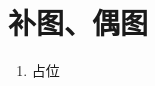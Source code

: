 \documentclass[../../main.tex]{subfiles}
\begin{document}
\section{补图、偶图}
\begin{enumerate}
    \item 占位
\end{enumerate}
\end{document}
